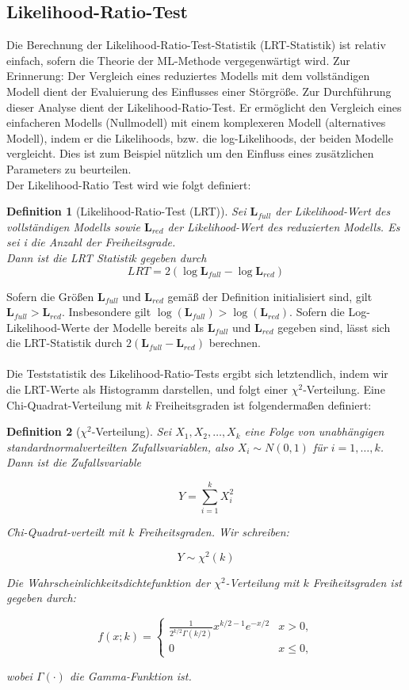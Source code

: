\documentclass[%
thesis=student,%
coverpage=false,%
titlepage=false,%
headmarks=true, %
german,%
font=libertine, %
math=newpxtx, %
BCOR=5mm,%
coverBCOR=11mm%
]{tumbook}
\theoremstyle{break}
\newtheorem{definition}{Definition}[section]
\begin{document}
\subsection{Likelihood-Ratio-Test}
Die Berechnung der Likelihood-Ratio-Test-Statistik (LRT-Statistik) ist relativ einfach, sofern die Theorie der ML-Methode vergegenwärtigt wird. Zur Erinnerung: Der Vergleich eines reduziertes Modells mit dem vollständigen Modell dient der Evaluierung des Einflusses einer Störgröße. Zur Durchführung dieser Analyse dient der Likelihood-Ratio-Test. Er ermöglicht den Vergleich eines einfacheren Modells (Nullmodell) mit einem komplexeren Modell (alternatives Modell), indem er die Likelihoods, bzw. die log-Likelihoods, der beiden Modelle vergleicht. Dies ist zum Beispiel nützlich um den Einfluss eines zusätzlichen Parameters zu beurteilen.\\
Der Likelihood-Ratio Test wird wie folgt definiert:\\
\begin{definition}[Likelihood-Ratio-Test (LRT)] 
	Sei $\mathbf{L}_{full}$ der Likelihood-Wert des vollständigen Modells sowie $\mathbf{L}_{red}$ der Likelihood-Wert des reduzierten Modells. Es sei i die Anzahl der Freiheitsgrade.\\
	Dann ist die LRT Statistik gegeben durch 
	$$ LRT = 2(\log \mathbf{L}_{full}- \log \mathbf{L}_{red}) $$ 
\end{definition} \noindent
Sofern die Größen $\mathbf{L}_{full}$ und $\mathbf{L}_{red}$ gemäß der Definition initialisiert sind, gilt $\mathbf{L}_{full} > \mathbf{L}_{red}$. Insbesondere gilt $\log(\mathbf{L}_{full}) > \log(\mathbf{L}_{red})$.
Sofern die Log-Likelihood-Werte der Modelle bereits als $\mathbf{L}_{full}$ und $\mathbf{L}_{red}$ gegeben sind, lässt sich die LRT-Statistik durch $2(\mathbf{L}_{full} - \mathbf{L}_{red})$ berechnen. \\
\\
Die Teststatistik des Likelihood-Ratio-Tests ergibt sich letztendlich, indem wir die LRT-Werte als Histogramm darstellen, und folgt einer $\chi^2$-Verteilung. Eine Chi-Quadrat-Verteilung mit $k$ Freiheitsgraden ist folgendermaßen definiert:
\begin{definition}[$\chi^2$-Verteilung]
	Sei \( X_1, X_2, \ldots, X_k \) eine Folge von unabhängigen standardnormalverteilten Zufallsvariablen, also \( X_i \sim N(0, 1) \) für \( i = 1, \ldots, k \). Dann ist die Zufallsvariable 
	
	\[
	Y = \sum_{i=1}^{k} X_i^2
	\]
	
	Chi-Quadrat-verteilt mit \( k \) Freiheitsgraden. Wir schreiben:
	
	\[
	Y \sim \chi^2(k)
	\]
	
	Die Wahrscheinlichkeitsdichtefunktion der $\chi^2$-Verteilung mit \( k \) Freiheitsgraden ist gegeben durch:
	
	\[
	f(x; k) = \begin{cases} 
		\frac{1}{2^{k/2} \Gamma(k/2)} x^{k/2 - 1} e^{-x/2} & x > 0, \\
		0 & x \le 0,
	\end{cases}
	\]
	
	wobei \( \Gamma(\cdot) \) die Gamma-Funktion ist.
\end{definition} \noindent
\end{document}
